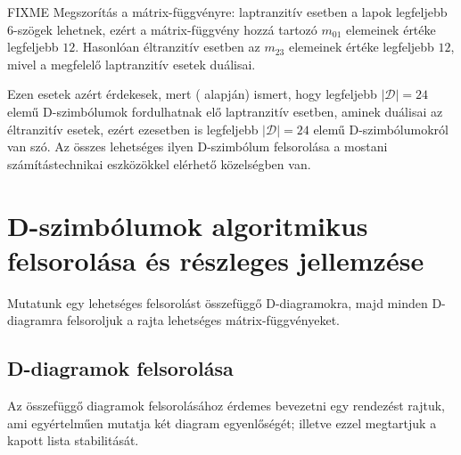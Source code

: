 \documentclass[12pt,magyar,a4paper]{article}
\begin{document}
FIXME Megszorítás a mátrix-függvényre: laptranzitív esetben a lapok legfeljebb
6-szögek lehetnek, ezért a mátrix-függvény hozzá tartozó $m_{01}$ elemeinek
értéke legfeljebb $12$. Hasonlóan éltranzitív esetben az $m_{23}$ elemeinek
értéke legfeljebb $12$, mivel a megfelelő laptranzitív esetek duálisai.

Ezen esetek azért érdekesek, mert (\cite{aa} alapján) ismert, hogy legfeljebb
$|\mathcal{D}|=24$ elemű D-szimbólumok fordulhatnak elő laptranzitív esetben,
aminek duálisai az éltranzitív esetek, ezért ezesetben is legfeljebb
$|\mathcal{D}|=24$ elemű D-szimbólumokról van szó. Az összes lehetséges ilyen
D-szimbólum felsorolása a mostani számítástechnikai eszközökkel elérhető
közelségben van.

\section{D-szimbólumok algoritmikus felsorolása és részleges jellemzése}
Mutatunk egy lehetséges felsorolást összefüggő D-diagramokra, majd minden D-diagramra
felsoroljuk a rajta lehetséges mátrix-függvényeket.

\subsection{D-diagramok felsorolása}
Az összefüggő diagramok felsorolásához érdemes bevezetni egy rendezést rajtuk,
ami egyértelműen mutatja két diagram egyenlőségét; illetve ezzel megtartjuk a
kapott lista stabilitását.
\end{document}
